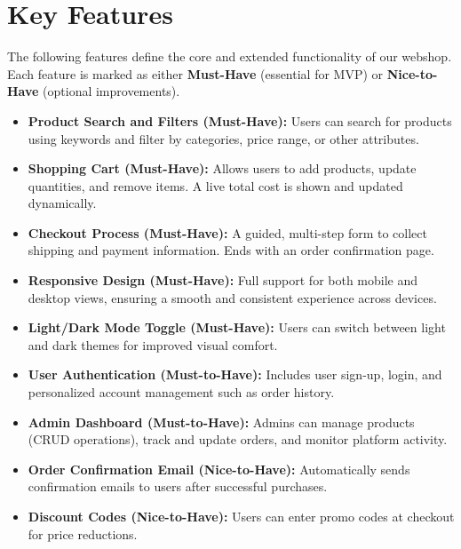 \documentclass[a4paper,12pt]{article}
\begin{document}
	
	\section{Key Features}

The following features define the core and extended functionality of our webshop. Each feature is marked as either \textbf{Must-Have} (essential for MVP) or \textbf{Nice-to-Have} (optional improvements).

\begin{itemize}
    \item \textbf{Product Search and Filters (Must-Have):}  
    Users can search for products using keywords and filter by categories, price range, or other attributes.
    
    \item \textbf{Shopping Cart (Must-Have):}  
    Allows users to add products, update quantities, and remove items. A live total cost is shown and updated dynamically.
    
    \item \textbf{Checkout Process (Must-Have):}  
    A guided, multi-step form to collect shipping and payment information. Ends with an order confirmation page.
    
    \item \textbf{Responsive Design (Must-Have):}  
    Full support for both mobile and desktop views, ensuring a smooth and consistent experience across devices.
    
    \item \textbf{Light/Dark Mode Toggle (Must-Have):}  
    Users can switch between light and dark themes for improved visual comfort.
    
    \item \textbf{User Authentication (Must-to-Have):}
    Includes user sign-up, login, and personalized account management such as order history.
    
    \item \textbf{Admin Dashboard (Must-to-Have):}
    Admins can manage products (CRUD operations), track and update orders, and monitor platform activity.
    
    \item \textbf{Order Confirmation Email (Nice-to-Have):}  
    Automatically sends confirmation emails to users after successful purchases.
    
    \item \textbf{Discount Codes (Nice-to-Have):}  
    Users can enter promo codes at checkout for price reductions.
\end{itemize}
\end{document}
